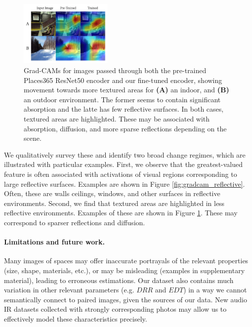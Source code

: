 \documentclass[10pt,twocolumn,letterpaper]{article}
\begin{document}
\begin{figure}[ht]
    \centering
    \includegraphics[width=0.4\textwidth]{gradcam_textured.png}
    \caption{Grad-CAMs for images passed through both the pre-trained Places365 ResNet50 encoder and our fine-tuned encoder, showing movement towards more textured areas for \textbf{(A)} an indoor, and \textbf{(B)} an outdoor environment. The former seems to contain significant absorption and the latte has few reflective surfaces. In both cases, textured areas are highlighted. These may be associated with absorption, diffusion, and more sparse reflections depending on the scene.}
    \label{fig:gradcam_textured}
\end{figure}

We qualitatively survey these and identify two broad change regimes, which are illustrated with particular examples. First, we observe that the greatest-valued feature is often associated with activations of visual regions corresponding to large reflective surfaces. Examples are shown in Figure \ref{fig:gradcam_reflective}. Often, these are walls ceilings, windows, and other surfaces in reflective environments. Second, we find that textured areas are highlighted in less reflective environments. Examples of these are shown in Figure \ref{fig:gradcam_textured}. These may correspond to sparser reflections and diffusion.

\paragraph{Limitations and future work.}
Many images of spaces may offer inaccurate portrayals of the relevant properties (size, shape, materials, etc.), or may be misleading (examples in supplementary material), leading to erroneous estimations. Our dataset also contains much variation in other relevant parameters (e.g. $DRR$ and $EDT$) in a way we cannot semantically connect to paired images, given the sources of our data. New audio IR datasets collected with strongly corresponding photos may allow us to effectively model these characteristics precisely.
\end{document}
